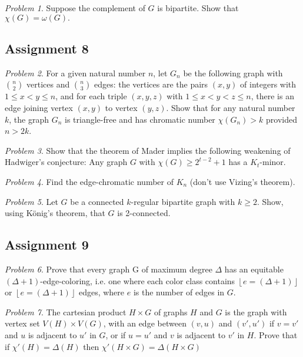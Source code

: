 \documentclass[10pt, fleqn, a4paper, landscape]{article}
\theoremstyle{plain} %
\theoremstyle{remark} %
\newtheorem{problem}{Problem}
\theoremstyle{definition} %
\begin{document}
\begin{multicols}{3}
\begin{tiny}
\begin{problem}
Suppose the complement of $G$ is bipartite. Show that $\chi(G) = \omega(G).$
\end{problem}

\subsection{Assignment 8}

\begin{problem}
For a given natural number $n$, let $G_n$ be the following graph with $\binom{n}{2}$ vertices and $\binom{n}{3}$ edges: the vertices are the pairs $(x, y)$ of integers with $1\le x < y \le n$, and for each triple $(x, y, z)$ with $1\le x < y < z\le n$, there is an edge joining vertex $(x, y)$ to vertex $(y, z)$. Show that for any natural number $k$, the graph $G_n$ is triangle-free and has chromatic number $\chi(G_n) > k$ provided $n > 2k$.
\end{problem}

\begin{problem}
Show that the theorem of Mader implies the following weakening of Hadwiger's
conjecture: Any graph $G$ with $\chi(G) \ge 2^{t-2} + 1$ has a $K_t$-minor.
\end{problem}

\begin{problem}
Find the edge-chromatic number of $K_n$ (don't use Vizing's theorem).
\end{problem}

\begin{problem}
Let $G$ be a connected $k$-regular bipartite graph with $k\ge 2$. Show, using König's theorem, that $G$ is 2-connected.
\end{problem}

\subsection{Assignment 9}

\begin{problem}
Prove that every graph G of maximum degree $\Delta$ has an equitable $(\Delta + 1)$-edge-coloring, i.e. one where each color class contains $\left\lfloor e=(\Delta + 1)\right\rfloor$ or $\left\lfloor e=(\Delta + 1)\right\rfloor$ edges, where $e$ is the number of edges in $G$.
\end{problem}

\begin{problem}
The cartesian product $H \times G $ of graphs $H$ and $G$ is the graph with vertex set $V (H)\times V (G)$, with an edge between $(v, u)$ and $(v', u')$ if $v = v'$ and $u$ is adjacent to $u'$ in $G$, or
if $u = u'$ and $v$ is adjacent to $v'$ in $H$. Prove that if $\chi'(H) = \Delta(H)$ then $\chi'(H\times G) = \Delta(H\times G)$
\end{problem}


\end{tiny}
\end{multicols}
\end{document}
